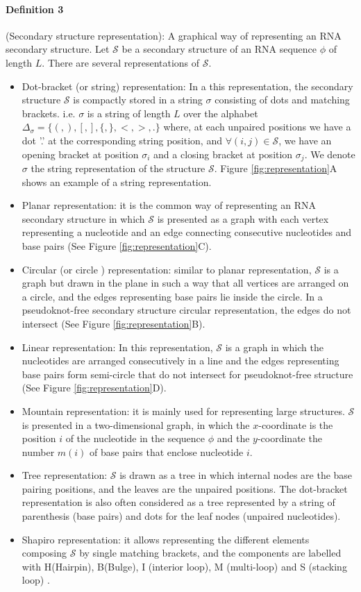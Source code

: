 \paragraph{\textbf{Definition 3} } (Secondary structure representation): A graphical way of representing an RNA secondary structure. Let $\mathcal{S}$ be a secondary structure of an RNA sequence $\phi$ of length $L$. There are several representations of $\mathcal{S}$. 
\begin{itemize}
	\item Dot-bracket (or string) representation: In a this representation, the secondary structure $\mathcal{S}$  is compactly stored in a string $\sigma$ consisting of dots and matching brackets. i.e.  $\sigma$ is a string of length $L$ over the alphabet $\Delta_{\sigma}= \big\{ (,),[,],\{,\},<,>,.\big\}$ where, at each unpaired positions we have a dot '.' at the corresponding string position, and $\forall (i,j) \in \mathcal{S}$, we have an opening bracket at position $\sigma_i$ and a closing bracket at position $\sigma_j$. We denote $\sigma$ the string representation of the structure $\mathcal{S}$. Figure \ref{fig:representation}A shows an example of a string representation.
	\item Planar representation: it is the common way of representing an RNA secondary structure in which $\mathcal{S}$ is presented as a graph with each vertex representing a nucleotide  and an edge connecting consecutive nucleotides and base pairs (See Figure \ref{fig:representation}C). 
	\item Circular (or circle ) representation: similar to planar representation, $\mathcal{S}$  is a graph but drawn in the plane in such a way that all vertices are arranged on a circle, and the edges representing base pairs lie inside the circle. In a pseudoknot-free secondary structure circular representation, the edges do not intersect (See Figure \ref{fig:representation}B).  
	\item Linear representation: In this representation, $\mathcal{S}$  is a graph in which the nucleotides are arranged consecutively in a line and the edges representing base pairs form semi-circle that do not intersect for pseudoknot-free structure (See Figure \ref{fig:representation}D).
	\item Mountain representation: it is mainly used for representing large structures. $\mathcal{S}$  is presented in a two-dimensional graph, in which the $x$-coordinate is the position $i$ of the nucleotide in the sequence $\phi$ and the $y$-coordinate the number $m(i)$ of base pairs that enclose nucleotide $i$.
	\item Tree representation: $\mathcal{S}$  is drawn as a tree in which internal nodes are the base pairing positions, and the leaves are the unpaired positions. The dot-bracket representation is also often considered as a tree represented by a string of parenthesis (base pairs) and dots for the leaf nodes (unpaired nucleotides). 
	\item Shapiro representation: it allows representing the different elements composing $\mathcal{S}$  by single matching brackets, and the components are labelled with H(Hairpin), B(Bulge), I (interior loop), M (multi-loop) and S (stacking loop) \cite{shapiro1990comparing}.
\end{itemize}
